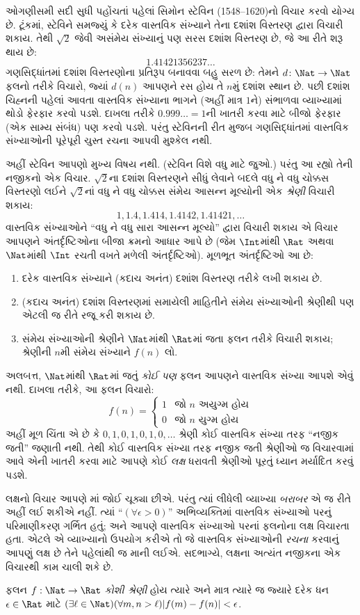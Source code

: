 ઓગણીસમી સદી સુધી પહોંચતાં પહેલાં સિમોન સ્ટેવિન (1548--1620)નો વિચાર
કરવો યોગ્ય છે. ટૂંકમાં, સ્ટેવિને સમજ્યું કે દરેક વાસ્તવિક સંખ્યાને
તેના દશાંશ વિસ્તરણ દ્વારા વિચારી શકાય. તેથી $\sqrt{2}$ જેવી અસંમેય
સંખ્યાનું પણ સરસ દશાંશ વિસ્તરણ છે, જે આ રીતે શરૂ થાય છે:
\[
	1.41421356237\ldots
\]
ગણસિદ્ધાંતમાં દશાંશ વિસ્તરણોના પ્રતિરૂપ બનાવવા બહુ સરળ છે: તેમને
$d \colon \Nat \to \Nat$ ફલનો તરીકે વિચારો, જ્યાં $d(n)$ આપણને
રસ હોય તે $n$મું દશાંશ સ્થાન છે. પછી દશાંશ ચિહ્નની પહેલાં આવતા
વાસ્તવિક સંખ્યાના ભાગને (અહીં માત્ર $1$ને) સંભાળવા વ્યાખ્યામાં થોડો
ફેરફાર કરવો પડશે. દાખલા તરીકે $0.999\ldots = 1$ની ખાતરી કરવા માટે
બીજો ફેરફાર (એક સામ્ય સંબંધ) પણ કરવો પડશે. પરંતુ સ્ટેવિનની રીત મુજબ
ગણસિદ્ધાંતમાં વાસ્તવિક સંખ્યાઓની પૂરેપૂરી ચુસ્ત રચના આપવી મુશ્કેલ નથી.

અહીં સ્ટેવિન આપણો મુખ્ય વિષય નથી. (સ્ટેવિન વિશે વધુ માટે
\citealt{KatzKatz2012} જુઓ.) પરંતુ આ રહ્યો તેની નજીકનો એક વિચાર.
$\sqrt{2}$ના દશાંશ વિસ્તરણને સીધું લેવાને બદલે વધુ ને વધુ ચોક્કસ
વિસ્તરણો લઈને $\sqrt{2}$નાં વધુ ને વધુ ચોક્કસ સંમેય આસન્ન મૂલ્યોની
એક \emph{શ્રેણી} વિચારી શકાય:
\[
1, 1.4, 1.414, 1.4142, 1.41421,\ldots
\]
વાસ્તવિક સંખ્યાઓને ``વધુ ને વધુ સારા આસન્ન મૂલ્યો'' દ્વારા વિચારી
શકાય એ વિચાર આપણને અંતર્દૃષ્ટિઓના બીજા ક્રમનો આધાર આપે છે (જેમ
$\Int$માંથી $\Rat$ અથવા $\Nat$માંથી $\Int$ રચતી વખતે મળેલી
અંતર્દૃષ્ટિઓ). મૂળભૂત અંતર્દૃષ્ટિઓ આ છે:
\begin{enumerate}
	\item દરેક વાસ્તવિક સંખ્યાને (કદાચ અનંત) દશાંશ વિસ્તરણ તરીકે લખી
	શકાય છે.
	\item (કદાચ અનંત) દશાંશ વિસ્તરણમાં સમાયેલી માહિતીને સંમેય સંખ્યાઓની
	શ્રેણીથી પણ એટલી જ રીતે રજૂ કરી શકાય છે.
	\item સંમેય સંખ્યાઓની શ્રેણીને $\Nat$માંથી $\Rat$માં જતા ફલન
	તરીકે વિચારી શકાય; શ્રેણીની $n$મી સંમેય સંખ્યાને $f(n)$ લો.
\end{enumerate}
અલબત્ત, $\Nat$માંથી $\Rat$માં જતું \emph{કોઈ પણ} ફલન આપણને વાસ્તવિક
સંખ્યા આપશે એવું નથી. દાખલા તરીકે, આ ફલન વિચારો:
\[
	f(n) =\begin{cases}
			1 & \text{જો }n\text{ અયુગ્મ હોય}\\
			0 &\text{જો }n\text{ યુગ્મ હોય}
		\end{cases}
\]
અહીં મૂળ ચિંતા એ છે કે $0,1,0,1,0,1,0,\ldots$ શ્રેણી કોઈ વાસ્તવિક
સંખ્યા તરફ ``નજીક જતી'' જણાતી નથી. તેથી કોઈ વાસ્તવિક સંખ્યા તરફ
નજીક જતી શ્રેણીઓ જ વિચારવામાં આવે એની ખાતરી કરવા માટે આપણે કોઈ
\emph{લક્ષ} ધરાવતી શ્રેણીઓ પૂરતું ધ્યાન મર્યાદિત કરવું પડશે.

લક્ષનો વિચાર આપણે માં જોઈ ચૂક્યા છીએ.
પરંતુ ત્યાં લીધેલી વ્યાખ્યા \emph{બરાબર} એ જ રીતે અહીં લઈ શકીએ નહીં.
ત્યાં ``$(\forall \epsilon>0)$'' અભિવ્યક્તિમાં વાસ્તવિક સંખ્યાઓ પરનું
પરિમાણીકરણ ગર્ભિત હતું; અને આપણે વાસ્તવિક સંખ્યાઓ પરનાં ફલનોના
લક્ષ વિચારતા હતા. એટલે એ વ્યાખ્યાનો ઉપયોગ કરીએ તો જે વાસ્તવિક સંખ્યાઓની
\emph{રચના} કરવાનું આપણું લક્ષ છે તેને પહેલાંથી જ માની લઈએ. સદભાગ્યે,
લક્ષના અત્યંત નજીકના એક વિચારથી કામ ચાલી શકે છે.
\begin{defn}
  ફલન $f: \Nat \to \Rat$ \emph{કોશી શ્રેણી} હોય ત્યારે અને માત્ર
  ત્યારે જ જ્યારે દરેક ધન $\epsilon \in \Rat$ માટે $(\exists \ell \in
  \Nat)(\forall m, n > \ell)|f(m) - f(n)| < \epsilon$.
\end{defn}

